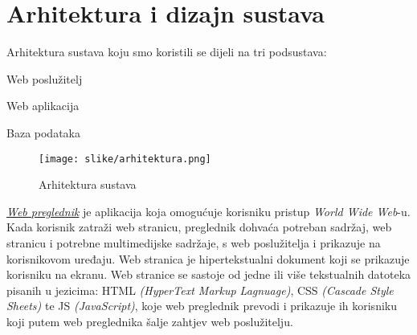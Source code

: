 \chapter{Arhitektura i dizajn sustava}
		
%

	Arhitektura sustava koju smo koristili se dijeli na tri podsustava:
	
		\begin{packed_item}
			\item Web poslužitelj
			\item Web aplikacija
			\item Baza podataka
		\end{packed_item}

		\begin{figure}[H]
			\texttt{[image: slike/arhitektura.png]}
			\centering
			\caption{Arhitektura sustava}
			\label{fig:arhitektura}
		\end{figure}
		
		\textit{\underline{Web preglednik}} je aplikacija koja omogućuje korisniku pristup \textit{World Wide Web}-u. Kada korisnik zatraži web stranicu, preglednik dohvaća potreban sadržaj, web stranicu i potrebne multimedijske sadržaje, s web poslužitelja i prikazuje na korisnikovom uređaju. Web stranica je hipertekstualni dokument koji se prikazuje korisniku na ekranu. Web stranice se sastoje od jedne ili više tekstualnih datoteka pisanih u jezicima: HTML \textit{(HyperText Markup Lagnuage)}, CSS \textit{(Cascade Style Sheets)} te JS \textit{(JavaScript)}, koje web preglednik prevodi i prikazuje ih korisniku koji putem web preglednika šalje zahtjev web poslužitelju.
		
